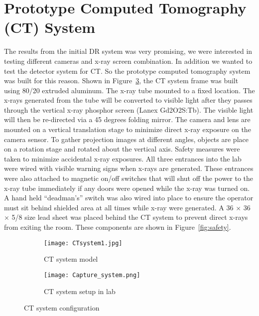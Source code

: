 \section{Prototype Computed Tomography (CT) System}
The results from the initial DR system was very promising, we were interested in testing different cameras and x-ray screen combination.  In addition we wanted to test the detector system for CT.  So the prototype computed tomography system was built for this reason.  Shown in Figure~\ref{fig:CTsystem}, the CT system frame was built using 80/20 extruded aluminum.  The x-ray tube mounted to a fixed location.  The x-rays generated from the tube will be converted to visible light after they passes through the vertical x-ray phosphor screen (Lanex Gd2O2S:Tb).  The visible light will then be re-directed via a 45 degrees folding mirror.  The camera and lens are mounted on a vertical translation stage to minimize direct x-ray exposure on the camera sensor.  To gather projection images at different angles, objects are place on a rotation stage and rotated about the vertical axis.  Safety measures were taken to minimize accidental x-ray exposures.  All three entrances into the lab were wired with visible warning signs when x-rays are generated.  These entrances were also attached to magnetic on/off switches that will shut off the power to the x-ray tube immediately if any doors were opened while the x-ray was turned on.  A hand held ``deadman's'' switch was also wired into place to ensure the operator must sit behind shielded area at all times while x-ray were generated.  A 36 \inches $\times$ 36 \inches $\times$ 5/8 \inches size lead sheet was placed behind the CT system to prevent direct x-rays from exiting the room.  These components are shown in Figure~\ref{fig:safety}.

\begin{figure}
	\begin{subfigure}[b]{0.4\linewidth}
	\centering
	\texttt{[image: CTsystem1.jpg]}
	\caption{CT system model}
	\label{fig:CTmodel}
	\end{subfigure}
\hspace{0.2cm}
	\begin{subfigure}[b]{0.4\linewidth}
	\centering
	\texttt{[image: Capture\_system.png]}
	\caption{CT system setup in lab}
	\label{fig:CTlab}
	\end{subfigure}
\caption{CT system configuration}
\label{fig:CTsystem}
\end{figure}

